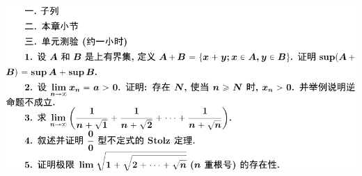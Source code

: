 \documentclass[11pt,a4paper]{ctexart}
\begin{document}
\begin{paracol}{2}
\includegraphics[width=\linewidth]{figure16.png}
\newpage



\small
\switchcolumn

\newpage
{}
\newpage
{}
\newpage
{}
\newpage
{}
\newpage
{}
\newpage
{}
\newpage
{}
\newpage
{}
\newpage
{}
\newpage
{}
\newpage
{}
\newpage
{}
\newpage
{}
\newpage
{}
\newpage
{}
\newpage
\end{paracol}
\end{document}
